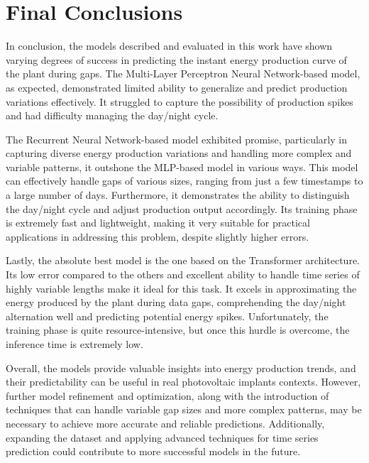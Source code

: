 \chapter{Final Conclusions}
In conclusion, the models described and evaluated in this work have shown varying degrees of success in predicting the instant energy production curve of the plant during gaps. The Multi-Layer Perceptron Neural Network-based model, as expected, demonstrated limited ability to generalize and predict production variations effectively. It struggled to capture the possibility of production spikes and had difficulty managing the day/night cycle.

The Recurrent Neural Network-based model exhibited promise, particularly in capturing diverse energy production variations and handling more complex and variable patterns, it outshone the MLP-based model in various ways. This model can effectively handle gaps of various sizes, ranging from just a few timestamps to a large number of days. Furthermore, it demonstrates the ability to distinguish the day/night cycle and adjust production output accordingly. Its training phase is extremely fast and lightweight, making it very suitable for practical applications in addressing this problem, despite slightly higher errors.

Lastly, the absolute best model is the one based on the Transformer architecture. Its low error compared to the others and excellent ability to handle time series of highly variable lengths make it ideal for this task. It excels in approximating the energy produced by the plant during data gaps, comprehending the day/night alternation well and predicting potential energy spikes. Unfortunately, the training phase is quite resource-intensive, but once this hurdle is overcome, the inference time is extremely low.

Overall, the models provide valuable insights into energy production trends, and their predictability can be useful in real photovoltaic implants contexts. However, further model refinement and optimization, along with the introduction of techniques that can handle variable gap sizes and more complex patterns, may be necessary to achieve more accurate and reliable predictions. Additionally, expanding the dataset and applying advanced techniques for time series prediction could contribute to more successful models in the future.